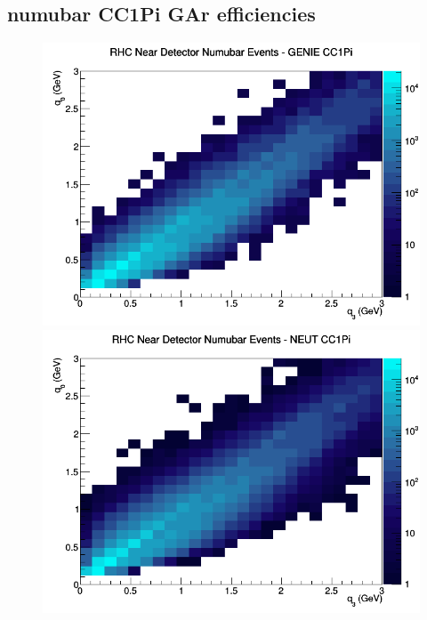 \documentclass[12pt]{article}
\begin{document}
\subsection{numubar CC1Pi GAr efficiencies}
\begin{figure}[h]
\includegraphics[width=\linewidth]{eff_q0_q3/GAr/CC1Pi_RHC_ND_numubar_q3_q0_GENIE.png}
\endminipage
{}
\includegraphics[width=\linewidth]{eff_q0_q3/GAr/CC1Pi_RHC_ND_numubar_q3_q0_NEUT.png}
\endminipage
{}

\end{figure}
\end{document}
